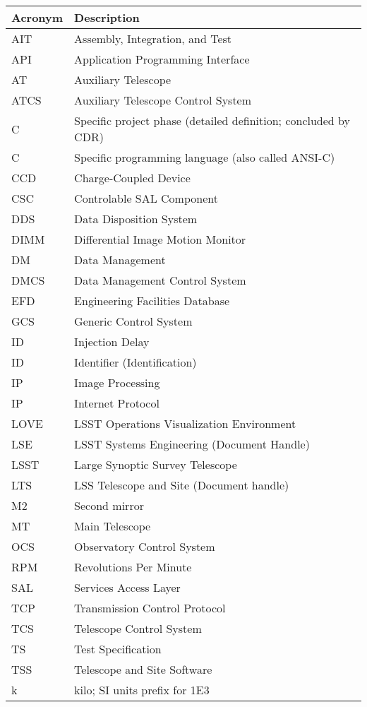 \addtocounter{table}{-1}
\begin{longtable}{|l|p{}|}\hline
\textbf{Acronym} & \textbf{Description}  \\\hline

AIT & Assembly, Integration, and Test \\\hline
API & Application Programming Interface \\\hline
AT & Auxiliary Telescope \\\hline
ATCS & Auxiliary Telescope Control System \\\hline
C & Specific project phase (detailed definition; concluded by CDR) \\\hline
C & Specific programming language (also called ANSI-C) \\\hline
CCD & Charge-Coupled Device \\\hline
CSC & Controlable SAL Component \\\hline
DDS & Data Disposition System \\\hline
DIMM & Differential Image Motion Monitor \\\hline
DM & Data Management \\\hline
DMCS & Data Management Control System \\\hline
EFD & Engineering Facilities Database \\\hline
GCS & Generic Control System \\\hline
ID & Injection Delay \\\hline
ID & Identifier (Identification) \\\hline
IP & Image Processing \\\hline
IP & Internet Protocol \\\hline
LOVE & LSST Operations Visualization Environment \\\hline
LSE & LSST Systems Engineering (Document Handle) \\\hline
LSST & Large Synoptic Survey Telescope \\\hline
LTS & LSS Telescope and Site (Document handle) \\\hline
M2 & Second mirror \\\hline
MT & Main Telescope \\\hline
OCS & Observatory Control System \\\hline
RPM & Revolutions Per Minute \\\hline
SAL & Services Access Layer \\\hline
TCP & Transmission Control Protocol \\\hline
TCS & Telescope Control System \\\hline
TS & Test Specification \\\hline
TSS & Telescope and Site Software \\\hline
k & kilo; SI units prefix for 1E3 \\\hline
\end{longtable}
